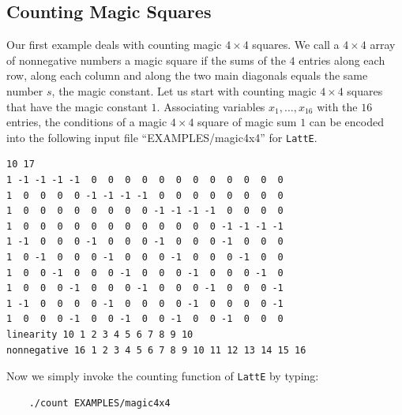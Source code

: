\documentclass{article}
\begin{document}
\subsection{Counting Magic Squares}
Our first example deals with counting magic $4\times 4$ squares. We 
call a $4\times 4$ array of nonnegative numbers a magic square if the
sums of the $4$ entries along each row, along each column and along
the two main diagonals equals the same number $s$, the magic
constant. Let us start with counting magic $4\times 4$ squares that
have the magic constant $1$. Associating variables $x_1,\ldots,x_{16}$ with
the $16$ entries, the conditions of a magic $4\times 4$ square of
magic sum $1$ can be encoded into the following input file
``EXAMPLES/magic4x4'' for {\tt LattE}.
\begin{verbatim}
10 17
1 -1 -1 -1 -1  0  0  0  0  0  0  0  0  0  0  0  0
1  0  0  0  0 -1 -1 -1 -1  0  0  0  0  0  0  0  0
1  0  0  0  0  0  0  0  0 -1 -1 -1 -1  0  0  0  0
1  0  0  0  0  0  0  0  0  0  0  0  0 -1 -1 -1 -1
1 -1  0  0  0 -1  0  0  0 -1  0  0  0 -1  0  0  0
1  0 -1  0  0  0 -1  0  0  0 -1  0  0  0 -1  0  0
1  0  0 -1  0  0  0 -1  0  0  0 -1  0  0  0 -1  0
1  0  0  0 -1  0  0  0 -1  0  0  0 -1  0  0  0 -1
1 -1  0  0  0  0 -1  0  0  0  0 -1  0  0  0  0 -1
1  0  0  0 -1  0  0 -1  0  0 -1  0  0 -1  0  0  0
linearity 10 1 2 3 4 5 6 7 8 9 10
nonnegative 16 1 2 3 4 5 6 7 8 9 10 11 12 13 14 15 16
\end{verbatim}
Now we simply invoke the counting function of {\tt LattE} by typing:
\begin{verbatim}
    ./count EXAMPLES/magic4x4
\end{verbatim}
\end{document}
